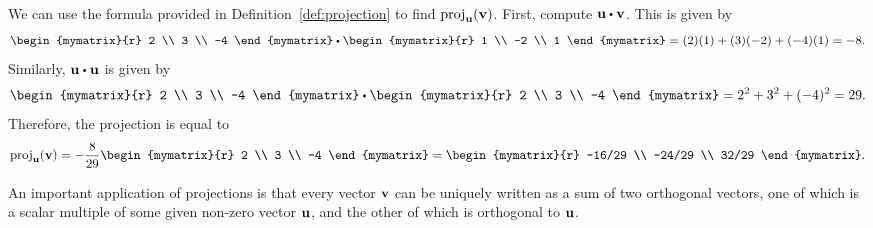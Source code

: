 \begin{solution}
  We can use the formula provided in Definition~\ref{def:projection}
  to find $\proj_{\vect{u}}(\vect{v})$.  First, compute
  $\vect{u} \dotprod \vect{v}$.  This is given by
  \begin{equation*}
    \begin{mymatrix}{r}
      2 \\
      3 \\
      -4
    \end{mymatrix}
    \dotprod
    \begin{mymatrix}{r}
      1 \\
      -2 \\
      1
    \end{mymatrix}
    = (2)(1) + (3)(-2) + (-4)(1)
    = -8.
   \end{equation*}
   Similarly, $\vect{u} \dotprod \vect{u}$ is given by
   \begin{equation*}
     \begin{mymatrix}{r}
       2 \\
       3 \\
       -4
     \end{mymatrix}
     \dotprod
     \begin{mymatrix}{r}
       2 \\
       3 \\
       -4
     \end{mymatrix}
     = 2^2 + 3^2 + (-4)^2
     = 29.
  \end{equation*}
  Therefore, the projection is equal to
  \begin{equation*}
    \proj_{\vect{u}}(\vect{v})
    =-\frac{8}{29}
        \begin{mymatrix}{r}
          2 \\
          3 \\
          -4
        \end{mymatrix}
    =
        \begin{mymatrix}{r}
          -16/29 \\
          -24/29 \\
          32/29
        \end{mymatrix}.
  \end{equation*}
\end{solution}

An important application of projections is that every vector
$\vect{v}$ can be uniquely written as a sum of two orthogonal vectors,
one of which is a scalar multiple of some given non-zero vector
$\vect{u}$, and the other of which is orthogonal to $\vect{u}$.

